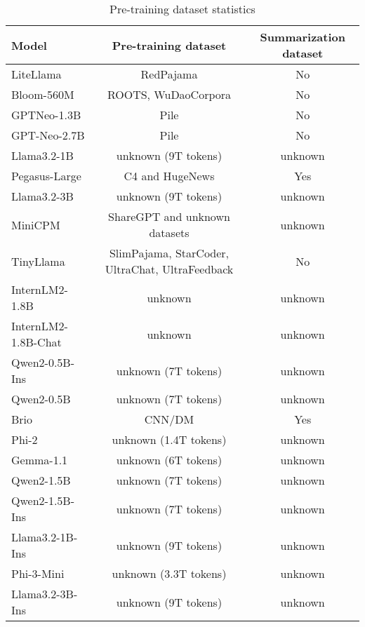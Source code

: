 \documentclass[a4paper]{article}
\begin{document}
\begin{table}[h]
\centering
\caption{Pre-training dataset statistics}
\label{tab:my-table}
\begin{tabular}{lcc}
\hline
Model               & Pre-training dataset                            & Summarization dataset \\ \hline
LiteLlama           & RedPajama                                       & No                    \\
Bloom-560M          & ROOTS, WuDaoCorpora                             & No                    \\
GPTNeo-1.3B         & Pile                                            & No                    \\
GPT-Neo-2.7B        & Pile                                            & No                    \\
Llama3.2-1B         & unknown (9T tokens)                             & unknown               \\
Pegasus-Large       & C4 and HugeNews                                 & Yes                   \\
Llama3.2-3B         & unknown (9T tokens)                             & unknown               \\
MiniCPM             & ShareGPT and unknown datasets                   & unknown               \\
TinyLlama           & SlimPajama, StarCoder, UltraChat, UltraFeedback & No                    \\
InternLM2-1.8B      & unknown                                         & unknown               \\
InternLM2-1.8B-Chat & unknown                                         & unknown               \\
Qwen2-0.5B-Ins      & unknown (7T tokens)                             & unknown               \\
Qwen2-0.5B          & unknown (7T tokens)                             & unknown               \\
Brio                & CNN/DM                                          & Yes                   \\
Phi-2               & unknown (1.4T tokens)                           & unknown               \\
Gemma-1.1           & unknown (6T tokens)                             & unknown               \\
Qwen2-1.5B          & unknown (7T tokens)                             & unknown               \\
Qwen2-1.5B-Ins      & unknown (7T tokens)                             & unknown               \\
Llama3.2-1B-Ins     & unknown (9T tokens)                             & unknown               \\
Phi-3-Mini          & unknown (3.3T tokens)                           & unknown               \\
Llama3.2-3B-Ins     & unknown (9T tokens)                             & unknown               \\ \hline
\end{tabular}
\end{table}
\end{document}
